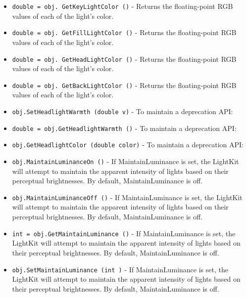 \begin{itemize}
\item  \verb|double = obj. GetKeyLightColor ()| -  Returns the floating-point RGB values of each of the light's color.

\item  \verb|double = obj. GetFillLightColor ()| -  Returns the floating-point RGB values of each of the light's color.

\item  \verb|double = obj. GetHeadLightColor ()| -  Returns the floating-point RGB values of each of the light's color.

\item  \verb|double = obj. GetBackLightColor ()| -  Returns the floating-point RGB values of each of the light's color.

\item  \verb|obj.SetHeadlightWarmth (double v)| -  To maintain a deprecation API:

\item  \verb|double = obj.GetHeadlightWarmth ()| -  To maintain a deprecation API:

\item  \verb|obj.GetHeadlightColor (double color)| -  To maintain a deprecation API:

\item  \verb|obj.MaintainLuminanceOn ()| -  If MaintainLuminance is set, the LightKit will attempt to maintain
 the apparent intensity of lights based on their perceptual brightnesses.
 By default, MaintainLuminance is off.

\item  \verb|obj.MaintainLuminanceOff ()| -  If MaintainLuminance is set, the LightKit will attempt to maintain
 the apparent intensity of lights based on their perceptual brightnesses.
 By default, MaintainLuminance is off.

\item  \verb|int = obj.GetMaintainLuminance ()| -  If MaintainLuminance is set, the LightKit will attempt to maintain
 the apparent intensity of lights based on their perceptual brightnesses.
 By default, MaintainLuminance is off.

\item  \verb|obj.SetMaintainLuminance (int )| -  If MaintainLuminance is set, the LightKit will attempt to maintain
 the apparent intensity of lights based on their perceptual brightnesses.
 By default, MaintainLuminance is off.


\end{itemize}

